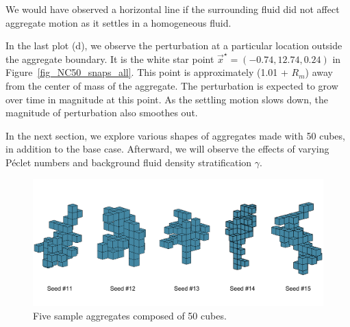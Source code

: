 We would have observed a horizontal line if the surrounding fluid did not affect aggregate motion as it settles in a homogeneous fluid. 
\par
In the last plot (d), we observe the perturbation at a particular location outside the aggregate boundary. It is the white star point $\vec{x}^{\star} = (-0.74, 12.74, 0.24)$ in Figure~\ref{fig_NC50_snaps_all}. This point is approximately (1.01 + $R_m$) away from the center of mass of the aggregate. The perturbation is expected to grow over time in magnitude at this point. As the settling motion slows down, the magnitude of perturbation also smoothes out. 
\par
In the next section, we explore various shapes of aggregates made with 50 cubes, in addition to the base case. Afterward, we will observe the effects of varying Péclet numbers and background fluid density stratification $\gamma$. 
\begin{figure}[ht]
	\begin{center}
		\includegraphics[scale=0.45]{./figures/fig_seed11_15_all.pdf}
	\caption{Five sample aggregates composed of 50 cubes.}
	\label{fig_seed11_15_all}
\end{center}
\end{figure}
\par
